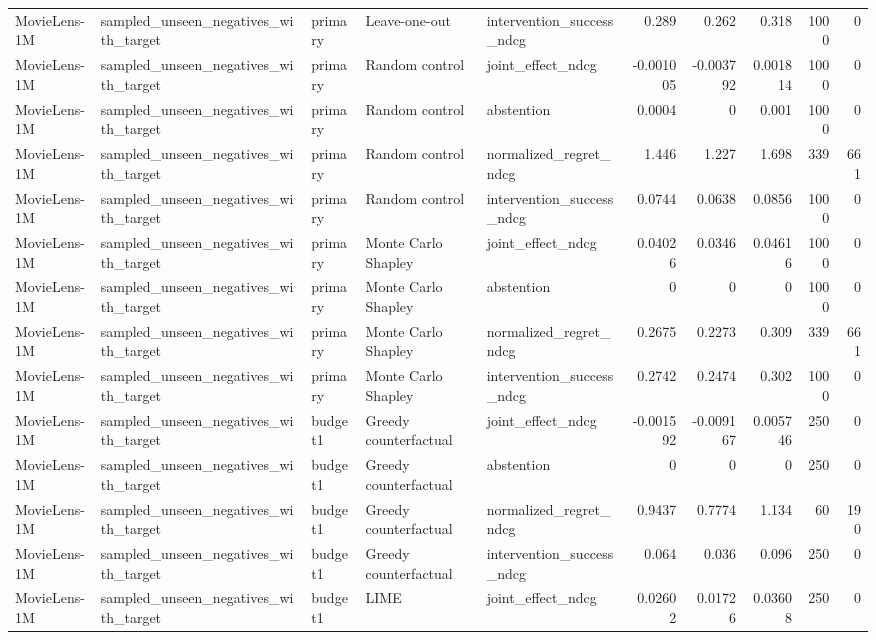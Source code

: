 \begin{table}[t]
{\begin{tabular}{lllllrrrrr}
MovieLens-1M & sampled\_unseen\_negatives\_with\_target & primary & Leave-one-out & intervention\_success\_ndcg & 0.289 & 0.262 & 0.318 & 1000 & 0 \\
MovieLens-1M & sampled\_unseen\_negatives\_with\_target & primary & Random control & joint\_effect\_ndcg & -0.001005 & -0.003792 & 0.001814 & 1000 & 0 \\
MovieLens-1M & sampled\_unseen\_negatives\_with\_target & primary & Random control & abstention & 0.0004 & 0 & 0.001 & 1000 & 0 \\
MovieLens-1M & sampled\_unseen\_negatives\_with\_target & primary & Random control & normalized\_regret\_ndcg & 1.446 & 1.227 & 1.698 & 339 & 661 \\
MovieLens-1M & sampled\_unseen\_negatives\_with\_target & primary & Random control & intervention\_success\_ndcg & 0.0744 & 0.0638 & 0.0856 & 1000 & 0 \\
MovieLens-1M & sampled\_unseen\_negatives\_with\_target & primary & Monte Carlo Shapley & joint\_effect\_ndcg & 0.04026 & 0.0346 & 0.04616 & 1000 & 0 \\
MovieLens-1M & sampled\_unseen\_negatives\_with\_target & primary & Monte Carlo Shapley & abstention & 0 & 0 & 0 & 1000 & 0 \\
MovieLens-1M & sampled\_unseen\_negatives\_with\_target & primary & Monte Carlo Shapley & normalized\_regret\_ndcg & 0.2675 & 0.2273 & 0.309 & 339 & 661 \\
MovieLens-1M & sampled\_unseen\_negatives\_with\_target & primary & Monte Carlo Shapley & intervention\_success\_ndcg & 0.2742 & 0.2474 & 0.302 & 1000 & 0 \\
MovieLens-1M & sampled\_unseen\_negatives\_with\_target & budget1 & Greedy counterfactual & joint\_effect\_ndcg & -0.001592 & -0.009167 & 0.005746 & 250 & 0 \\
MovieLens-1M & sampled\_unseen\_negatives\_with\_target & budget1 & Greedy counterfactual & abstention & 0 & 0 & 0 & 250 & 0 \\
MovieLens-1M & sampled\_unseen\_negatives\_with\_target & budget1 & Greedy counterfactual & normalized\_regret\_ndcg & 0.9437 & 0.7774 & 1.134 & 60 & 190 \\
MovieLens-1M & sampled\_unseen\_negatives\_with\_target & budget1 & Greedy counterfactual & intervention\_success\_ndcg & 0.064 & 0.036 & 0.096 & 250 & 0 \\
MovieLens-1M & sampled\_unseen\_negatives\_with\_target & budget1 & LIME & joint\_effect\_ndcg & 0.02602 & 0.01726 & 0.03608 & 250 & 0 \\

\end{tabular}}
\end{table}
